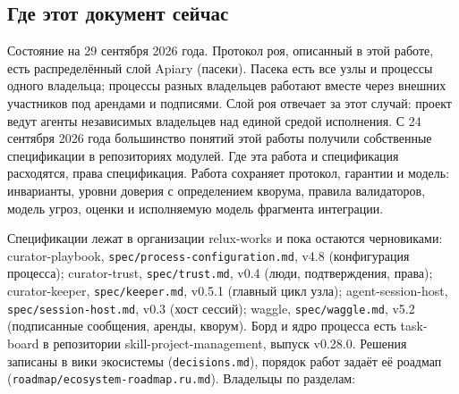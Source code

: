\documentclass[11pt,a4paper]{article}
\begin{document}
\subsection*{Где этот документ сейчас}

Состояние на 29 сентября 2026 года. Протокол роя, описанный в этой работе, есть распределённый слой Apiary (пасеки). Пасека есть все узлы и процессы одного владельца; процессы разных владельцев работают вместе через внешних участников под арендами и подписями. Слой роя отвечает за этот случай: проект ведут агенты независимых владельцев над единой средой исполнения. С 24 сентября 2026 года большинство понятий этой работы получили собственные спецификации в репозиториях модулей. Где эта работа и спецификация расходятся, права спецификация. Работа сохраняет протокол, гарантии и модель: инварианты, уровни доверия с определением кворума, правила валидаторов, модель угроз, оценки и исполняемую модель фрагмента интеграции.

Спецификации лежат в организации relux-works и пока остаются черновиками: curator-playbook, \texttt{spec/process-configuration.md}, v4.8 (конфигурация процесса); curator-trust, \texttt{spec/trust.md}, v0.4 (люди, подтверждения, права); curator-keeper, \texttt{spec/keeper.md}, v0.5.1 (главный цикл узла); agent-session-host, \texttt{spec/session-host.md}, v0.3 (хост сессий); waggle, \texttt{spec/waggle.md}, v5.2 (подписанные сообщения, аренды, кворум). Борд и ядро процесса есть task-board в репозитории skill-project-management, выпуск v0.28.0. Решения записаны в вики экосистемы (\texttt{decisions.md}), порядок работ задаёт её роадмап (\texttt{roadmap/ecosystem-roadmap.ru.md}). Владельцы по разделам:
\end{document}
